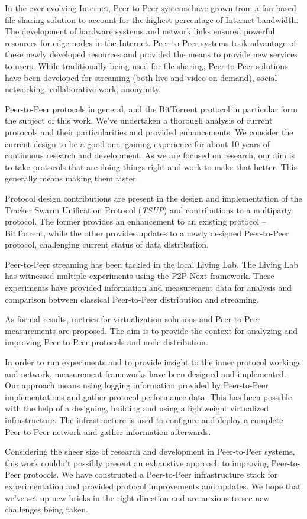 
In the ever evolving Internet, Peer-to-Peer systems have grown from a
fan-based file sharing solution to account for the highest percentage of
Internet bandwidth. The development of hardware systems and network links
ensured powerful resources for edge nodes in the Internet. Peer-to-Peer
systems took advantage of these newly developed resources and provided the
means to provide new services to users. While traditionally being used for
file sharing, Peer-to-Peer solutions have been developed for streaming (both
live and video-on-demand), social networking, collaborative work, anonymity.

Peer-to-Peer protocols in general, and the BitTorrent protocol in particular
form the subject of this work. We've undertaken a thorough analysis of current
protocols and their particularities and provided enhancements. We consider the
current design to be a good one, gaining experience for about 10 years of
continuous research and development. As we are focused on research, our aim is
to take protocols that are doing things right and work to make that better.
This generally means making them faster.

Protocol design contributions are present in the design and implementation of
the Tracker Swarm Unification Protocol (\textit{TSUP}) and contributions to a
multiparty protocol. The former provides an enhancement to an existing
protocol -- BitTorrent, while the other provides updates to a newly designed
Peer-to-Peer protocol, challenging current status of data distribution.

Peer-to-Peer streaming has been tackled in the local Living Lab. The Living
Lab has witnessed multiple experiments using the P2P-Next framework. These
experiments have provided information and measurement data for analysis and
comparison between classical Peer-to-Peer distribution and streaming.

As formal results, metrics for virtualization solutions and Peer-to-Peer
measurements are proposed. The aim is to provide the context for analyzing and
improving Peer-to-Peer protocols and node distribution.

In order to run experiments and to provide insight to the inner protocol
workings and network, measurement frameworks have been designed and
implemented. Our approach means using logging information provided by
Peer-to-Peer implementations and gather protocol performance data. This has
been possible with the help of a designing, building and using a lightweight
virtualized infrastructure. The infrastructure is used to configure and deploy
a complete Peer-to-Peer network and gather information afterwards.

Considering the sheer size of research and development in Peer-to-Peer
systems, this work couldn't possibly present an exhaustive approach to
improving Peer-to-Peer protocols. We have constructed a Peer-to-Peer
infrastructure stack for experimentation and provided protocol improvements
and updates. We hope that we've set up new bricks in the right direction and
are anxious to see new challenges being taken.
